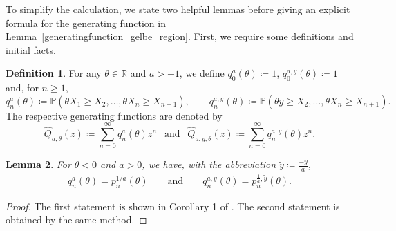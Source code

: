 \documentclass[12pt]{article}
\newcommand{\R}{\mathbb{R}} %
\renewcommand{\P}{\mathbb{P}} %
\newcommand{\1}{\mathds{1}}
\theoremstyle{definition}
\newtheorem{definition}{Definition}[section]
\theoremstyle{plain}
\newtheorem{Lemma}[definition]{Lemma}
\theoremstyle{remark}
\begin{document}
To simplify the calculation, we state two helpful lemmas before giving an explicit formula for the generating function in Lemma~\ref{generatingfunction_gelbe_region}. First, we require some definitions and initial facts.
\begin{definition}\label{def_q_n_and_Q}
    For any $\theta\in \R$ and $a>-1$, we define  $q_0^a(\theta)\coloneqq1$, $q_0^{a,y}(\theta)\coloneqq1$ and, for $n\geq 1$,
    $$
    q_n^a(\theta)\coloneqq\P(\theta X_1\geq  X_2,\dots,\theta X_n\geq X_{n+1}),\qquad q_n^{a,y}(\theta)\coloneqq\P(\theta y\geq  X_2,\dots,\theta X_n\geq X_{n+1}).
    $$ 
    The respective generating functions are denoted by
    $$\hat{Q}_{a,\theta}(z)\coloneqq\sum_{n=0}^{\infty} q_n^{a}(\theta)z^n ~~\text{ and }~~\hat{Q}_{a,y,\theta}(z)\coloneqq\sum_{n=0}^{\infty} q_n^{a,y}(\theta)z^n.$$
\end{definition}
\begin{Lemma}
For $\theta <0$ and $a>0$, we have, with the abbreviation $\tilde{y}\coloneqq\frac{-y}{a}$,
  \begin{align}\label{cor1_aurzada,raschel}
      q_n^a(\theta)=p_n^{1/a}(\theta)\qquad\text{and}\qquad q_n^{a,y}(\theta)=p_n^{\frac{1}{a},\tilde{y}}(\theta).
  \end{align}
\end{Lemma}
\begin{proof}
    The first statement is shown in Corollary 1 of \cite{AurzadaRaschel}. The second statement is obtained by the same method.
\end{proof}
\end{document}
